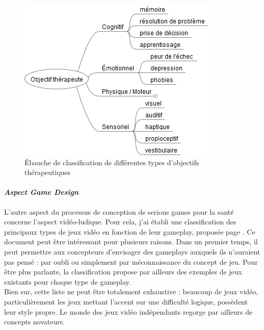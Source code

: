 \begin{figure}[hbtp]
	\centering
	\includegraphics[scale=0.7]{images/objectifs_autres}
	\caption{Ébauche de classification de différentes types d'objectifs thérapeutiques}
	\label{objectifs_autres}
\end{figure}

			\paragraph{\emph{Aspect Game Design}\\}
L'autre aspect du processus de conception de serious games pour la santé concerne l'aspect vidéo-ludique. Pour cela, j'ai établi une classification des principaux types de jeux vidéo en fonction de leur gameplay, proposée page \pageref{types_jeux}. Ce document peut être intéressant pour plusieurs raisons. Dans un premier temps, il peut permettre aux concepteurs d'envisager des gameplays auxquels ils n'auraient pas pensé : par oubli ou simplement par méconnaissance du concept de jeu. Pour être plus parlante, la classification propose par ailleurs des exemples de jeux existants pour chaque type de gameplay. \\
Bien sur, cette liste ne peut être totalement exhaustive : beaucoup de jeux vidéo, particulièrement les jeux mettant l'accent sur une difficulté logique, possèdent leur style propre. Le monde des jeux vidéo indépendants regorge par ailleurs de concepts novateurs.

\pagebreak
\makeatletter
\label{types_jeux}
\makeatother




